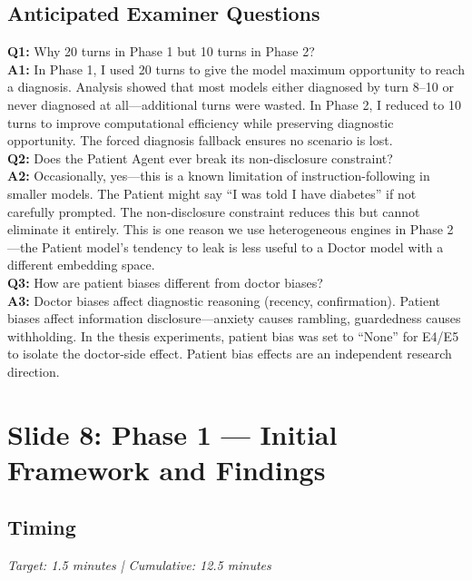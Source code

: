 \documentclass[12pt]{article}
\begin{document}
  \subsection*{Anticipated Examiner Questions}
  \begin{qabox}
  \textbf{Q1:} Why 20 turns in Phase 1 but 10 turns in Phase 2? \\
  \textbf{A1:} In Phase 1, I used 20 turns to give the model maximum opportunity to reach a diagnosis. Analysis showed that most models either diagnosed by turn 8--10 or never diagnosed at all---additional turns were wasted. In Phase 2, I reduced to 10 turns to improve computational efficiency while preserving diagnostic opportunity. The forced diagnosis fallback ensures no scenario is lost. \\[6pt]
  \textbf{Q2:} Does the Patient Agent ever break its non-disclosure constraint? \\
  \textbf{A2:} Occasionally, yes---this is a known limitation of instruction-following in smaller models. The Patient might say ``I was told I have diabetes'' if not carefully prompted. The non-disclosure constraint reduces this but cannot eliminate it entirely. This is one reason we use heterogeneous engines in Phase 2---the Patient model's tendency to leak is less useful to a Doctor model with a different embedding space. \\[6pt]
  \textbf{Q3:} How are patient biases different from doctor biases? \\
  \textbf{A3:} Doctor biases affect diagnostic reasoning (recency, confirmation). Patient biases affect information disclosure---anxiety causes rambling, guardedness causes withholding. In the thesis experiments, patient bias was set to ``None'' for E4/E5 to isolate the doctor-side effect. Patient bias effects are an independent research direction.
  \end{qabox}



  \section{Slide 8: Phase 1 --- Initial Framework and Findings}

  \subsection*{Timing}
  \textit{Target: 1.5 minutes | Cumulative: 12.5 minutes}
\end{document}
